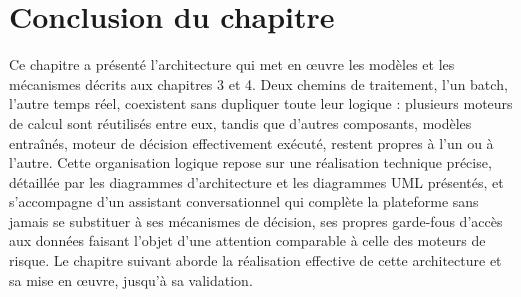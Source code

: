 \section*{Conclusion du chapitre}

Ce chapitre a présenté l'architecture qui met en œuvre les modèles et les mécanismes décrits aux chapitres 3 et 4. Deux chemins de traitement, l'un batch, l'autre temps réel, coexistent sans dupliquer toute leur logique : plusieurs moteurs de calcul sont réutilisés entre eux, tandis que d'autres composants, modèles entraînés, moteur de décision effectivement exécuté, restent propres à l'un ou à l'autre. Cette organisation logique repose sur une réalisation technique précise, détaillée par les diagrammes d'architecture et les diagrammes UML présentés, et s'accompagne d'un assistant conversationnel qui complète la plateforme sans jamais se substituer à ses mécanismes de décision, ses propres garde-fous d'accès aux données faisant l'objet d'une attention comparable à celle des moteurs de risque. Le chapitre suivant aborde la réalisation effective de cette architecture et sa mise en œuvre, jusqu'à sa validation.
